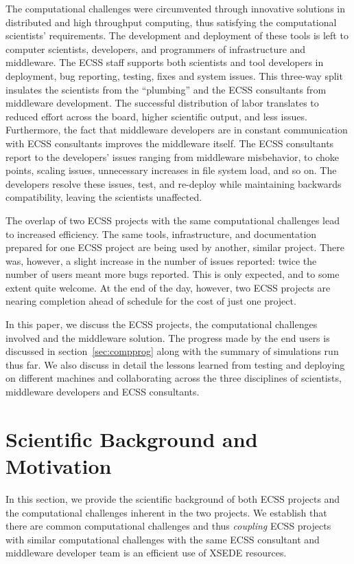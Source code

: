\documentclass{sig-alternate}
\begin{document}
The computational challenges were circumvented through innovative solutions in
distributed and high throughput computing, thus satisfying the computational
scientists' requirements. The development and deployment of these tools is left
to computer scientists, developers, and programmers of infrastructure and
middleware. The ECSS staff supports both scientists and tool developers in
deployment, bug reporting, testing, fixes and system issues. This three-way
split insulates the scientists from the ``plumbing'' and the ECSS consultants
from middleware development. The successful distribution of labor translates
to reduced effort across the board, higher scientific output, and less issues.
Furthermore, the fact that middleware developers are in constant communication
with ECSS consultants improves the middleware itself. The ECSS consultants
report to the developers' issues ranging from middleware misbehavior,
to choke points, scaling issues, unnecessary increases in file system load, and so
on. The developers resolve these issues, test, and re-deploy while maintaining
backwards compatibility, leaving the scientists unaffected.

The overlap of two ECSS projects with the same computational challenges lead to
increased efficiency. The same tools, infrastructure, and documentation prepared
for one ECSS project are being used by another, similar project. There was,
however, a slight increase in the number of issues reported: twice the number
of users meant more bugs reported. This is only expected, and to some extent
quite welcome. At the end of the day, however, two ECSS projects are nearing
completion ahead of schedule for the cost of just one project.

In this paper, we discuss the ECSS projects, the computational challenges
involved and the middleware solution. The progress made by the end users
is discussed in section~\ref{sec:compprog} along with the summary of
simulations run thus far. We also discuss in detail the lessons
learned from testing and deploying on different machines and collaborating
across the three disciplines of scientists, middleware developers and ECSS
consultants.



\section{Scientific Background and Motivation}

In this section, we provide the scientific background of both ECSS
projects and the computational challenges inherent in the two
projects. We establish that there are common computational challenges
and thus {\it coupling} ECSS projects with similar computational
challenges with the same ECSS consultant and middleware developer team
is an efficient use of XSEDE resources.
\end{document}
